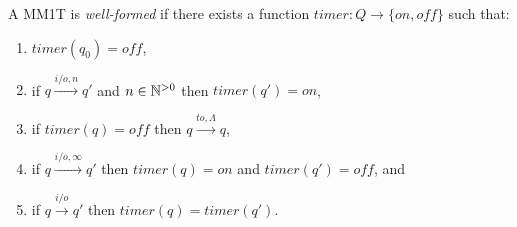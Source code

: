 A MM1T is \emph{well-formed} if there exists a function $\mathit{timer}: Q \rightarrow \{ \mathit{on}, \mathit{off} \}$
such that:
\begin{enumerate}
\item
$\mathit{timer}(q_0) =  \mathit{off}$,
\item
if $q \xrightarrow{i/o, n} q'$ and $n \in {\mathbb N}^{>0}$ then $\mathit{timer}(q') = \mathit{on}$,
\item
if $\mathit{timer}(q) =  \mathit{off}$ then $q \xrightarrow{\mathit{to}, \Lambda} q$,
\item
if $q \xrightarrow{i/o, \infty} q'$ then $\mathit{timer}(q) = \mathit{on}$ and $\mathit{timer}(q') = \mathit{off}$, and
\item
if $q \xrightarrow{i/o} q'$ then $\mathit{timer}(q)= \mathit{timer}(q')$.
\end{enumerate}

